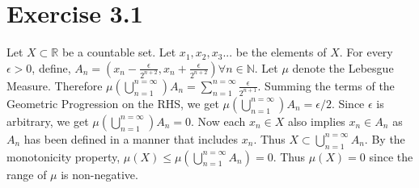 \documentclass{article}
\begin{document}
  \section*{Exercise 3.1}
    Let $X \subset \mathbb R$ be a countable set. Let $x_1, x_2, x_3 ...$ be the elements of $X$. For every $\epsilon > 0$, define, $A_n = (x_n - \frac{\epsilon}{2^{n+2}}, x_n + \frac{\epsilon}{2^{n+2}}) \forall n \in \mathbb N$.
    Let $\mu$ denote the Lebesgue Measure. Therefore $\mu(\bigcup_{n=1}^{n=\infty})A_n = \sum_{n=1}^{n=\infty}\frac{\epsilon}{2^{n+1}}$. Summing the terms of the Geometric Progression on the RHS, we get
    $\mu(\bigcup_{n=1}^{n=\infty})A_n = \epsilon /2$. Since $\epsilon$ is arbitrary, we get $\mu(\bigcup_{n=1}^{n=\infty})A_n = 0$. Now each $x_n \in X$ also implies $x_n \in A_n$ as $A_n$ has been defined in a manner that includes $x_n$.
    Thus $X \subset \bigcup_{n=1}^{n=\infty}A_n$. By the monotonicity property, $\mu(X) \le \mu(\bigcup_{n=1}^{n=\infty}A_n) = 0$. Thus $\mu(X) = 0$ since the range of $\mu$ is non-negative.
\end{document}
